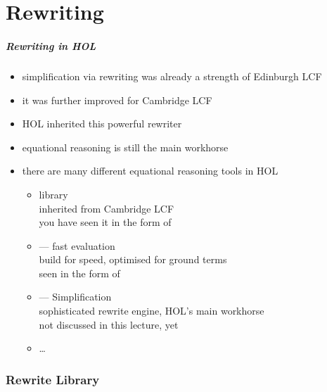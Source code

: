 \part{Rewriting}

\frame[plain]{\partpage}

\begin{frame}
\frametitle{Rewriting in HOL}

\begin{itemize}
\item simplification via rewriting was already a strength of Edinburgh LCF
\item it was further improved for Cambridge LCF
\item HOL inherited this powerful rewriter
\item equational reasoning is still the main workhorse
\item there are many different equational reasoning tools in HOL
\begin{itemize}
\item {} library\\
inherited from Cambridge LCF\\you have seen it in the form of 
\item {} --- fast evaluation\\
build for speed, optimised for ground terms\\seen in the form of 
\item {} --- Simplification\\
sophisticated rewrite engine, HOL's main workhorse\\
not discussed in this lecture, yet
\item \ldots
\end{itemize}
\end{itemize}
\end{frame}


\section{Rewrite Library}

